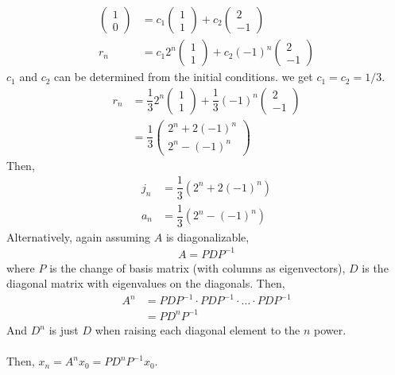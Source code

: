 \documentclass[letterpaper,12pt]{article}
\begin{document}
\begin{align*}
    \begin{pmatrix} 1 \\ 0 \end{pmatrix} & = c_1 \begin{pmatrix} 1 \\ 1 \end{pmatrix} + c_2 \begin{pmatrix} 2 \\ -1 \end{pmatrix} \\
    r_n & = c_1 2^n \begin{pmatrix} 1 \\ 1 \end{pmatrix} + c_2 (-1)^n \begin{pmatrix} 2 \\ -1 \end{pmatrix}
\end{align*}
$c_1$ and $c_2$ can be determined from the initial conditions. we get $c_1 = c_2 = 1/3$.
\begin{align*}
    r_n & = \dfrac{1}{3} 2^n \begin{pmatrix} 1 \\ 1 \end{pmatrix} + \dfrac{1}{3} (-1)^n \begin{pmatrix} 2 \\ -1 \end{pmatrix} \\
    & = \dfrac{1}{3}\begin{pmatrix} 2^n + 2(-1)^n \\ 2^n - (-1)^n \end{pmatrix}
\end{align*}
Then,
\begin{align*}
    j_n & = \dfrac{1}{3}(2^n + 2(-1)^n) \\
    a_n & = \dfrac{1}{3}(2^n - (-1)^n)
\end{align*}
Alternatively, again assuming $A$ is diagonalizable,
\begin{align*}
    A = PDP^{-1}
\end{align*}
where $P$ is the change of basis matrix (with columns as eigenvectors), $D$ is the diagonal matrix with eigenvalues on the diagonals. Then,
\begin{align*}
    A^n & = PDP^{-1} \cdot PDP^{-1} \cdot \dots \cdot PDP^{-1} \\
    & = PD^n P^{-1}
\end{align*}
And $D^n$ is just $D$ when raising each diagonal element to the $n$ power.
\\ \\ Then, $x_n = A^n x_0 = PD^n P^{-1}x_0$.
\end{document}
